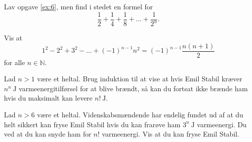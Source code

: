 \documentclass[a4paper,12pt]{article}
\theoremstyle{plain}
\newcommand{\N}{\mathbb{N}}
\begin{document}
\begin{Exercise}
  Lav opgave \ref{ex:6}, men find i stedet en formel for
  \[
    \frac{1}{2}+\frac{1}{4}+\frac{1}{8}+\dots+\frac{1}{2^n}.
  \]
\end{Exercise}
\begin{Exercise}
  Vis at
  \[
    1^2-2^2+3^2-\dots+(-1)^{n-1}n^{2}=(-1)^{n-1}\frac{n(n+1)}{2}
  \]
  for alle \(n\in\N\).
\end{Exercise}
\begin{Exercise}
  Lad \(n>1\) være et heltal. Brug induktion til at vise at hvis Emil Stabil kræver \(n^n\ \mathrm{J}\) varmeenergitilførsel for at blive brændt, så kan du fortsat ikke brænde ham hvis du maksimalt kan levere \(n!\ \mathrm{J}\).
\end{Exercise}
\begin{Exercise}
  Lad \(n>6\) være et heltal. Videnskabsmændende har endelig fundet ud af at du helt sikkert kan fryse Emil Stabil hvis du kan frarøve ham \(3^n\ \mathrm{J}\) varmeenergi. Du ved at du kan snyde ham for \(n!\) varmeenergi. Vis at du kan fryse Emil Stabil.
\end{Exercise}
\end{document}

